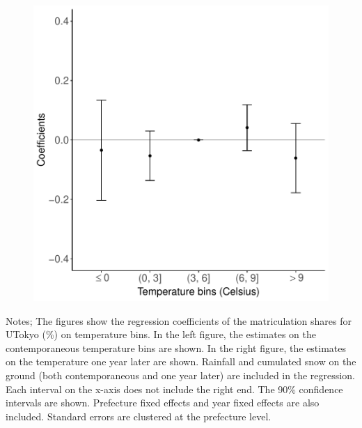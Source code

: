 \documentclass[10pt, pdfmx,hiresbb]{beamer}
\begin{document}
\begin{frame}
\begin{minipage}{0.49\textwidth}
\begin{figure}[h]
      \includegraphics[width = \textwidth]{../Output/images/reg_placebo_f1_4.pdf}
      \centering
    \end{figure}
  \end{minipage}
  \tiny
  \begin{tablenotes}
  \item Notes;
    The figures show the regression coefficients of the matriculation shares for UTokyo (\%) on temperature bins.
    In the left figure, the estimates on the contemporaneous temperature bins are shown.
    In the right figure, the estimates on the temperature one year later are shown.
    Rainfall and cumulated snow on the ground (both contemporaneous and one year later) are included in the regression.
    Each interval on the x-axis does not include the right end.
    The 90\% confidence intervals are shown.
    Prefecture fixed effects and year fixed effects are also included.
    Standard errors are clustered at the prefecture level.
  \end{tablenotes}
\end{frame}
\end{document}
